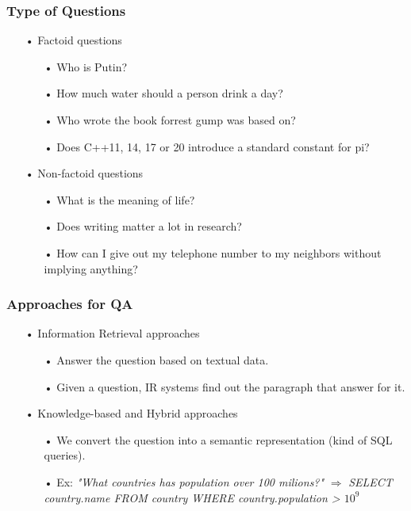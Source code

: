 \documentclass{beamer}
\begin{document}
\begin{frame}
	\footnotesize
	\frametitle{Type of Questions}
			
	\begin{itemize}
		\item[•] Factoid questions
			\begin{itemize}
				\item[•] Who is Putin?
				\item[•] How much water should a person drink a day?
				\item[•] Who wrote the book forrest gump was based on?
				\item[•] Does C++11, 14, 17 or 20 introduce a standard constant for pi?
			\end{itemize}
		
		\item[•] Non-factoid questions
			\begin{itemize}
			\item[•] What is the meaning of life?
			\item[•] Does writing matter a lot in research?
				\item[•] How can I give out my telephone number to my neighbors without implying anything?
			\end{itemize}
	\end{itemize}
			
\end{frame}


\begin{frame}
	\frametitle{Approaches for QA}		
			
	\begin{itemize}
		\item[•] Information Retrieval approaches
			\begin{itemize}
				\item[•] Answer the question based on textual data.
				\item[•] Given a question, IR systems find out the paragraph that answer for it.
			\end{itemize}
		
		\item[•] Knowledge-based and Hybrid approaches
			\begin{itemize}
			\item[•] We convert the question into a semantic representation (kind of SQL queries).
			\item[•] Ex: \textit{"What countries has population over 100 milions?"} $\Rightarrow$ \textit{SELECT country.name FROM country WHERE country.population > $10^9$}
			\end{itemize}
	\end{itemize}		
		
			
\end{frame}
\end{document}
